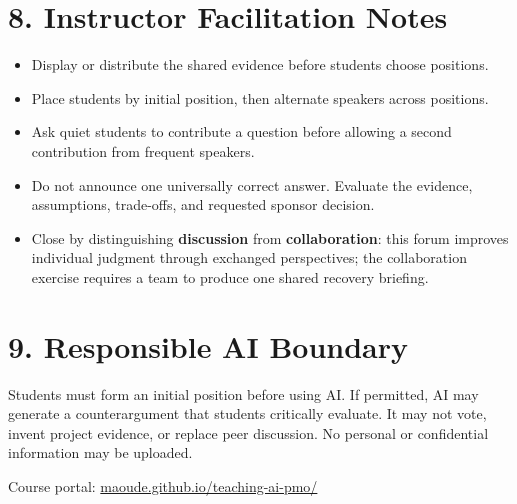 \documentclass[11pt,a4paper]{article}
\begin{document}
\section{8. Instructor Facilitation Notes}

\begin{itemize}
  \item Display or distribute the shared evidence before students choose positions.
  \item Place students by initial position, then alternate speakers across positions.
  \item Ask quiet students to contribute a question before allowing a second contribution from frequent speakers.
  \item Do not announce one universally correct answer. Evaluate the evidence, assumptions, trade-offs, and requested sponsor decision.
  \item Close by distinguishing \textbf{discussion} from \textbf{collaboration}: this forum improves individual judgment through exchanged perspectives; the collaboration exercise requires a team to produce one shared recovery briefing.
\end{itemize}

\section{9. Responsible AI Boundary}

Students must form an initial position before using AI. If permitted, AI may generate a counterargument that students critically evaluate. It may not vote, invent project evidence, or replace peer discussion. No personal or confidential information may be uploaded.

\vfill
\begin{center}
\small\color{pmoTeal}
Course portal: \href{https://maoude.github.io/teaching-ai-pmo/}{maoude.github.io/teaching-ai-pmo/}
\end{center}
\end{document}
